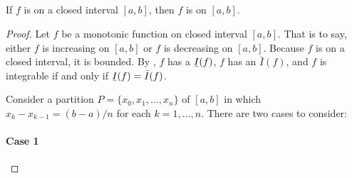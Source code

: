 \documentclass{report}
\begin{document}
\subsection{}%
\label{sub:theorem-1.12}

\begin{theorem}[1.12]

  If $f$ is  on a closed interval $[a, b]$, then $f$
    is  on $[a, b]$.

\end{theorem}

\begin{proof}

  Let $f$ be a monotonic function on closed interval $[a, b]$.
  That is to say, either $f$ is increasing on $[a, b]$ or $f$ is decreasing on
    $[a, b]$.
  Because $f$ is on a closed interval, it is bounded.
  By , $f$ has a 
    $\ubar{I}(f)$, $f$ has an  $\bar{I}(f)$,
    and $f$ is integrable if and only if $\ubar{I}(f) = \bar{I}(f)$.

  Consider a partition $P = \{x_0, x_1, \ldots, x_n\}$ of $[a, b]$ in which
    $x_k - x_{k-1} = (b - a) / n$ for each $k = 1, \ldots, n$.
  There are two cases to consider:

  \paragraph{Case 1}%


\end{proof}
\end{document}
